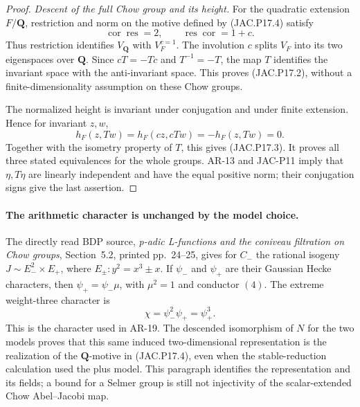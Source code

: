 \begin{proof}
\emph{Descent of the full Chow group and its height.}
For the quadratic extension $F/\mathbf Q$, restriction and
norm on the motive defined by (JAC.P17.4) satisfy
\[
 \operatorname{cor}\operatorname{res}=2,
 \qquad \operatorname{res}\operatorname{cor}=1+c.
                                                               \tag{JAC.P17.8}
\]
Thus restriction identifies $V_{\mathbf Q}$ with $V_F^{c=1}$.
The involution $c$ splits $V_F$ into its two eigenspaces over
$\mathbf Q$. Since $cT=-Tc$ and $T^{-1}=-T$, the map $T$
identifies the invariant space with the anti-invariant space.
This proves (JAC.P17.2), without a finite-dimensionality
assumption on these Chow groups.

The normalized height is invariant under conjugation and under
finite extension. Hence for invariant $z,w$,
\[
 h_F(z,Tw)=h_F(cz,cTw)=-h_F(z,Tw)=0.
\]
Together with the isometry property of $T$, this gives
(JAC.P17.3). It proves all three stated equivalences for the
whole groups. AR-13 and JAC-P11 imply that $\eta,T\eta$ are
linearly independent and have the equal positive norm; their
conjugation signs give the last assertion.
\end{proof}

\paragraph{The arithmetic character is unchanged by the model choice.}
The directly read BDP source, \emph{p-adic L-functions and the
coniveau filtration on Chow groups}, Section~5.2, printed
pp.~24--25, gives for $C_-$ the rational isogeny
$J\sim E_-^2\times E_+$, where $E_\pm:y^2=x^3\pm x$.
If $\psi_-$ and $\psi_+$ are their Gaussian Hecke characters,
then $\psi_+=\psi_-\mu$, with $\mu^2=1$ and conductor $(4)$.
The extreme weight-three character is
\[
                \chi=\psi_-^2\psi_+=\psi_+^3.
                                                               \tag{JAC.P17.9}
\]
This is the character used in AR-19. The descended isomorphism
of $N$ for the two models proves that this same induced
two-dimensional representation is the realization of the
$\mathbf Q$-motive in (JAC.P17.4), even when the stable-reduction
calculation used the plus model. This paragraph identifies the
representation and its fields; a bound for a Selmer group is
still not injectivity of the scalar-extended Chow Abel--Jacobi map.


